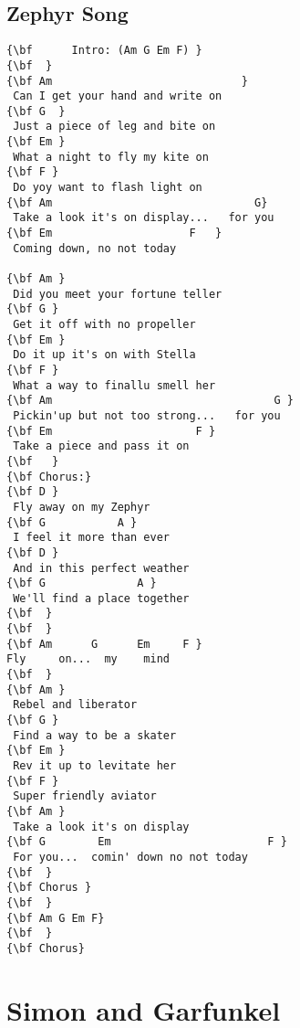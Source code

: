 \documentclass[a4paper]{article}
\begin{document}
\subsection{Zephyr Song}
\begin{multicols}{2}\begin{Verbatim}[commandchars=\\\{\}]
{\bf 	  Intro: (Am G Em F) }
{\bf  }
{\bf Am                             }
 Can I get your hand and write on 
{\bf G  }
 Just a piece of leg and bite on 
{\bf Em }
 What a night to fly my kite on 
{\bf F }
 Do yoy want to flash light on 
{\bf Am                               G}
 Take a look it's on display...   for you 
{\bf Em                     F   }
 Coming down, no not today 

{\bf Am }
 Did you meet your fortune teller 
{\bf G }
 Get it off with no propeller 
{\bf Em }
 Do it up it's on with Stella 
{\bf F }
 What a way to finallu smell her 
{\bf Am                                  G }
 Pickin'up but not too strong...   for you 
{\bf Em                      F }
 Take a piece and pass it on 
{\bf ￼￼}
{\bf Chorus:}
{\bf D }
 Fly away on my Zephyr 
{\bf G           A }
 I feel it more than ever 
{\bf D }
 And in this perfect weather 
{\bf G              A }
 We'll find a place together
{\bf ￼}
{\bf  }
{\bf Am      G      Em     F }
Fly     on...  my    mind 
{\bf  }
{\bf Am }
 Rebel and liberator 
{\bf G }
 Find a way to be a skater 
{\bf Em }
 Rev it up to levitate her 
{\bf F }
 Super friendly aviator 
{\bf Am }
 Take a look it's on display 
{\bf G        Em                        F }
 For you...  comin' down no not today 
{\bf  }
{\bf Chorus }
{\bf  }
{\bf Am G Em F}
{\bf  }
{\bf Chorus}

\end{Verbatim}
\end{multicols}\newpage
\section{Simon and Garfunkel}
\end{document}
